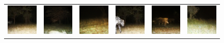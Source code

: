 \begin{figure}[htp!]
\begin{tabularx}{\textwidth}{>{\centering\arraybackslash}X >{\centering\arraybackslash}X >{\centering\arraybackslash}X >{\centering\arraybackslash}X >{\centering\arraybackslash}X >{\centering\arraybackslash}X}
        \includegraphics{gfx/unconditional-diffusion-sampling-qual/rgb_S2_B05_R1_IMAG0084.jpg} & \includegraphics{gfx/unconditional-diffusion-sampling-qual/cyclegan_S2_B06_R1_PICT0387_fake.png} & \includegraphics{gfx/unconditional-diffusion-sampling-qual/diffusion_S2_B06_R1_PICT0387.png} & \includegraphics{gfx/unconditional-diffusion-sampling-qual/rgb_S2_B05_R1_IMAG0132.jpg} & \includegraphics{gfx/unconditional-diffusion-sampling-qual/cyclegan_S2_B06_R3_PICT1364_fake.png} & \includegraphics{gfx/unconditional-diffusion-sampling-qual/diffusion_S2_B06_R3_PICT1364.png} \\

\end{tabularx}
\end{figure}
